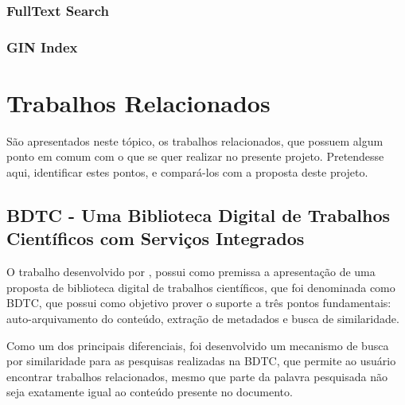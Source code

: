 \subsubsection{FullText Search}
\subsubsection{GIN Index}


\section{Trabalhos Relacionados}\label{sec:rw}

São apresentados neste tópico, os trabalhos relacionados, que possuem
algum ponto em comum com o que se quer realizar no presente projeto.
Pretendesse aqui, identificar estes pontos, e compará-los com a proposta deste projeto.

\subsection{BDTC - Uma Biblioteca Digital de Trabalhos Científicos com Serviços Integrados}

O trabalho desenvolvido por \cite{CERVI:bdtc}, possui como premissa a apresentação
de uma proposta de biblioteca digital de trabalhos científicos, que foi denominada como
BDTC, que possui como objetivo prover o suporte a três pontos fundamentais:
auto-arquivamento do conteúdo, extração de metadados e busca de similaridade.

Como um dos principais diferenciais, foi desenvolvido um mecanismo de
busca por similaridade para as pesquisas realizadas na BDTC,
que permite ao usuário encontrar trabalhos relacionados, mesmo que
parte da palavra pesquisada não seja exatamente igual ao conteúdo presente
no documento.

